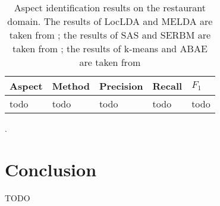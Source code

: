 \documentclass{article}
\begin{document}
\begin{table}[tbh!]
\begin{center}
\begin{tabular}[t]{l|l|l|l|l}
\hline
 Aspect & Method & Precision & Recall & $F_1$ \\
\hline
todo & todo & todo & todo & todo  \\
\hline
\end{tabular}
\caption{Aspect identification results on the restaurant domain. The results of LocLDA and MELDA are taken from \cite{Zhao2010JMA}; the results of SAS and SERBM are taken from \cite{Wang2015}; the results of k-means and ABAE are taken from \cite{He2018ABAE}}.
\label{tab:eval}
\end{center}
\end{table}


\section{Conclusion}
TODO



\end{document}
